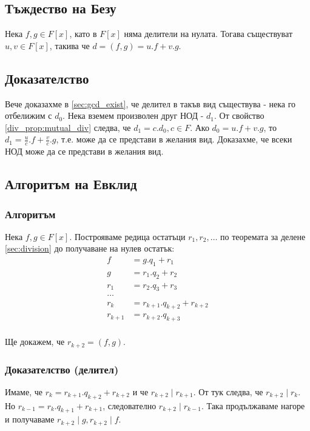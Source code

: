 \documentclass[fleqn,12pt]{article}
\begin{document}
\subsection{Тъждество на Безу}
Нека $f,g \in F[x]$, като в $F[x]$ няма делители на нулата. Тогава съществуват $u,v \in F[x]$, такива че $d= (f,g) = u.f + v.g$.

\subsection{Доказателство}
Вече доказахме в \ref{sec:gcd_exist}, че делител в такъв вид съществува - нека го отбелижим с $d_0$. Нека вземем произволен 
друг НОД - $d_1$. От свойство \ref{div_prop:mutual_div} следва, че $d_1 = c . d_0, c \in F$. Ако $d_0 = u.f + v.g$, то 
$d_1 = \frac{u}{c} . f + \frac{v}{c} . g$, т.е. може да се представи в желания вид. Доказахме, че всеки НОД може да се 
представи в желания вид.

\subsection{Алгоритъм на Евклид}
\subsubsection{Алгоритъм}
Нека $f,g \in F[x]$. Построяваме редица остатъци $r_1, r_2, \dots$ по теоремата за делене \ref{sec:division} до получаване на нулев остатък:
\begin{align}
f &= g . q_1 + r_1 \\
g &= r_1 . q_2 + r_2 \\
r_1 &= r_2 . q_3 + r_3 \\
\dots \\
r_k &= r_{k + 1} . q_{k + 2} + r_{k + 2} \\
r_{k + 1} &= r_{k + 2} . q_{k + 3} \\
\end{align}

Ще докажем, че $r_{k+2} = (f,g)$.

\subsubsection{Доказателство (делител)}
Имаме, че $r_k = r_{k + 1} . q_{k + 2} + r_{k + 2}$ и че $r_{k+2} \mid r_{k+1}$.
От тук следва, че $r_{k+2} \mid r_k$. Но $r_{k - 1} = r_{k} . q_{k + 1} + r_{k + 1}$,
следователно $r_{k+2} \mid r_{k-1}$. Така продължаваме нагоре и получаваме $r_{k+2} \mid g, r_{k+2} \mid f$.
\end{document}
